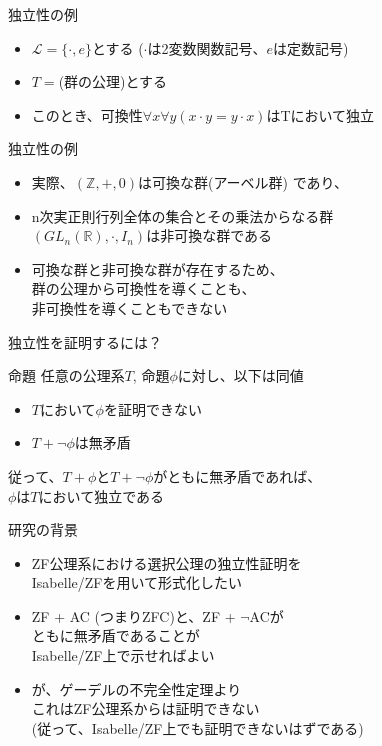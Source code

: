\documentclass[17pt,aspectratio=169,xcolor=dvipsnames,table,dvipdfmx]{beamer}
\theoremstyle{definition}
\begin{document}
\begin{frame} {独立性の例}
    \begin{itemize}
        \item $\mathcal{L} = \{ \cdot, e \}$とする {\small ($\cdot$は2変数関数記号、$e$は定数記号)}
        \item $T = $(群の公理)とする
        \item このとき、可換性$\forall x \forall y (x\cdot y = y \cdot x)$はTにおいて独立
    \end{itemize}
\end{frame}

\begin{frame} {独立性の例}
    \begin{itemize}
        \item 実際、$(\mathbb{Z}, +, 0)$は可換な群{\small (アーベル群) }であり、
        \item n次実正則行列全体の集合とその乗法からなる群 \\$(GL_n(\mathbb{R}), \cdot, I_n)$は非可換な群である
        \item 可換な群と非可換な群が存在するため、\\群の公理から可換性を導くことも、\\非可換性を導くこともできない
    \end{itemize}
\end{frame}

\begin{frame} {独立性を証明するには？}
    \begin{exampleblock}{命題}
        任意の公理系$T$, 命題$\phi$に対し、以下は同値
        \begin{itemize}
            \item $T$において$\phi$を証明できない
            \item $T + \neg \phi$は無矛盾
        \end{itemize}
    \end{exampleblock}
    従って、$T + \phi$と$T + \neg \phi$がともに無矛盾であれば、\\$\phi$は$T$において独立である
\end{frame}

\begin{frame} {研究の背景}
    \begin{itemize}
        \item ZF公理系における選択公理の独立性証明を\\Isabelle/ZFを用いて形式化したい
        \item ZF + AC (つまりZFC)と、ZF + $\neg$ACが\\ ともに無矛盾であることが\\Isabelle/ZF上で示せればよい
        \item が、ゲーデルの不完全性定理より\\これはZF公理系からは証明できない\\{\small (従って、Isabelle/ZF上でも証明できないはずである)}
    \end{itemize}
\end{frame}
\end{document}
